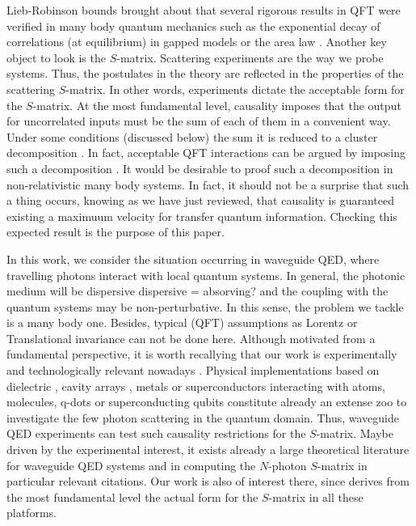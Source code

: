 \documentclass[notitlepage, prx, preprint, amsmath,superscriptaddress,amssymb]{revtex4-1}
\begin{document}
Lieb-Robinson bounds  brought about that several rigorous results in QFT  were verified in many body quantum mechanics such as the exponential decay of correlations (at equilibrium)  in gapped models or  the area law \cite{Nachtergaele2006, Hastings2007}.   Another key object  to look is the $S$-matrix.  Scattering experiments  are the way we probe systems.  Thus, the postulates in the theory are reflected in the properties  of the scattering  $S$-matrix.   In other words, experiments dictate the acceptable form for the $S$-matrix.  At the most fundamental level, causality imposes that the output for  uncorrelated inputs must be the sum of each of them in a convenient way.   Under some conditions (discussed below) the sum it is reduced to a  cluster decomposition \cite{Wichmann1963}.   
In fact,  acceptable QFT interactions  can be argued by imposing such a decomposition   \cite{weinberg1995}.   
It would be desirable to proof such a decomposition in non-relativistic many body systems.  In fact, it should not be a surprise that such a thing occurs, knowing as we have just reviewed, that causality is guaranteed existing a maximuum velocity for transfer quantum information.  Checking this expected result is the purpose of this paper.

In this work, we consider the situation  occurring in  waveguide QED,  where travelling photons interact with local quantum systems.   In general, the photonic medium will be dispersive
{\color{red} dispersive = absorving?} and the coupling with the quantum systems may be non-perturbative.  In this sense, the problem we tackle is a many body one.  Besides,  typical (QFT) assumptions as Lorentz or Translational invariance can not be done here.  Although  motivated from a fundamental perspective, it is worth recallying that our work is experimentally  and technologically relevant nowadays \cite{lodahl15review}.
Physical implementations based on dielectric \cite{Mitsch2014, Yu2014}, cavity arrays \cite{Vuckovic2003}, metals  \cite{Lukin2007} or superconductors \cite{astafiev10, hoi11, Liu2016, Forn-Diaz2016} interacting with atoms, molecules,  q-dots or superconducting qubits constitute already an extense zoo to investigate the few photon scattering in the quantum domain. 
Thus,  waveguide QED experiments can test such causality restrictions for the $S$-matrix. 
Maybe driven by  the experimental interest, it exists already a large  theoretical literature for  waveguide QED systems \cite{Roy2016}  and in  computing the $N$-photon $S$-matrix in particular {\color{red} relevant citations}.  Our work is also of interest there, since derives from the most fundamental level the actual form for the $S$-matrix in all these platforms.
\end{document}
